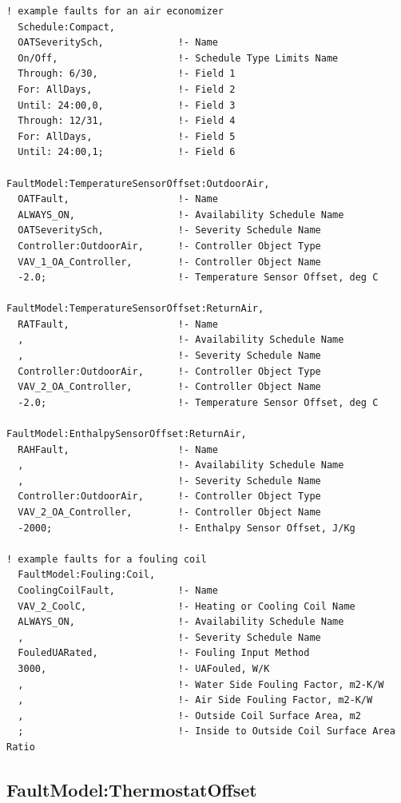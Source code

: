 \begin{lstlisting}
! example faults for an air economizer
  Schedule:Compact,
  OATSeveritySch,             !- Name
  On/Off,                     !- Schedule Type Limits Name
  Through: 6/30,              !- Field 1
  For: AllDays,               !- Field 2
  Until: 24:00,0,             !- Field 3
  Through: 12/31,             !- Field 4
  For: AllDays,               !- Field 5
  Until: 24:00,1;             !- Field 6

FaultModel:TemperatureSensorOffset:OutdoorAir,
  OATFault,                   !- Name
  ALWAYS_ON,                  !- Availability Schedule Name
  OATSeveritySch,             !- Severity Schedule Name
  Controller:OutdoorAir,      !- Controller Object Type
  VAV_1_OA_Controller,        !- Controller Object Name
  -2.0;                       !- Temperature Sensor Offset, deg C

FaultModel:TemperatureSensorOffset:ReturnAir,
  RATFault,                   !- Name
  ,                           !- Availability Schedule Name
  ,                           !- Severity Schedule Name
  Controller:OutdoorAir,      !- Controller Object Type
  VAV_2_OA_Controller,        !- Controller Object Name
  -2.0;                       !- Temperature Sensor Offset, deg C

FaultModel:EnthalpySensorOffset:ReturnAir,
  RAHFault,                   !- Name
  ,                           !- Availability Schedule Name
  ,                           !- Severity Schedule Name
  Controller:OutdoorAir,      !- Controller Object Type
  VAV_2_OA_Controller,        !- Controller Object Name
  -2000;                      !- Enthalpy Sensor Offset, J/Kg

! example faults for a fouling coil
  FaultModel:Fouling:Coil,
  CoolingCoilFault,           !- Name
  VAV_2_CoolC,                !- Heating or Cooling Coil Name
  ALWAYS_ON,                  !- Availability Schedule Name
  ,                           !- Severity Schedule Name
  FouledUARated,              !- Fouling Input Method
  3000,                       !- UAFouled, W/K
  ,                           !- Water Side Fouling Factor, m2-K/W
  ,                           !- Air Side Fouling Factor, m2-K/W
  ,                           !- Outside Coil Surface Area, m2
  ;                           !- Inside to Outside Coil Surface Area Ratio
\end{lstlisting}

\subsection{FaultModel:ThermostatOffset}\label{faultmodelthermostatoffset}

